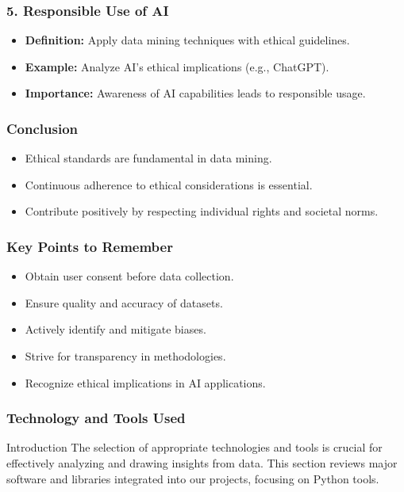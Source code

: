 \documentclass[aspectratio=169]{beamer}
\begin{document}
\begin{frame}[fragile]
    \frametitle{5. Responsible Use of AI}
    \begin{itemize}
        \item \textbf{Definition:} Apply data mining techniques with ethical guidelines.
        \item \textbf{Example:} Analyze AI's ethical implications (e.g., ChatGPT).
        \item \textbf{Importance:} Awareness of AI capabilities leads to responsible usage.
    \end{itemize}
\end{frame}

\begin{frame}[fragile]
    \frametitle{Conclusion}
    \begin{itemize}
        \item Ethical standards are fundamental in data mining.
        \item Continuous adherence to ethical considerations is essential.
        \item Contribute positively by respecting individual rights and societal norms.
    \end{itemize}
\end{frame}

\begin{frame}[fragile]
    \frametitle{Key Points to Remember}
    \begin{itemize}
        \item Obtain user consent before data collection.
        \item Ensure quality and accuracy of datasets.
        \item Actively identify and mitigate biases.
        \item Strive for transparency in methodologies.
        \item Recognize ethical implications in AI applications.
    \end{itemize}
\end{frame}

\begin{frame}
    \frametitle{Technology and Tools Used}
    \begin{block}{Introduction}
        The selection of appropriate technologies and tools is crucial for effectively analyzing and drawing insights from data. This section reviews major software and libraries integrated into our projects, focusing on Python tools.
    \end{block}
\end{frame}
\end{document}
